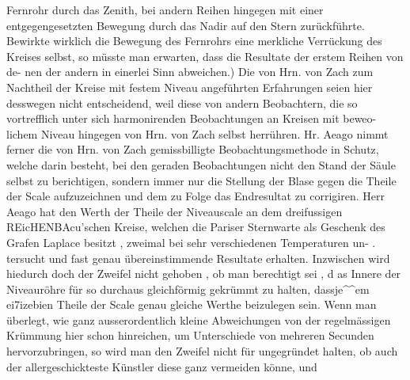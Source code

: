 \documentclass[12pt,a4paper]{article}
\begin{document}
Fernrohr durch das Zenith, bei andern Reihen hingegen mit einer entgegengesetzten Bewegung durch\newline
das Nadir auf den Stern zurückführte. Bewirkte wirklich die Bewegung des Fernrohrs eine merkliche\newline
Verrückung des Kreises selbst, so müsste man erwarten, dass die Resultate der erstem Reihen von de-\newline
nen der andern in einerlei Sinn abweichen.) Die von Hrn. von Zach zum Nachtheil der Kreise mit\newline
festem Niveau angeführten Erfahrungen seien hier desswegen nicht entscheidend, weil diese von andern\newline
Beobachtern, die so vortrefflich unter sich harmonirenden Beobachtungen an Kreisen mit beweo-lichem\newline
Niveau hingegen von Hrn. von Zach selbst herrühren. Hr. Aeago nimmt ferner die von Hrn. von Zach\newline
gemissbilligte Beobachtungsmethode in Schutz, welche darin besteht, bei den geraden Beobachtungen\newline
nicht den Stand der Säule selbst zu berichtigen, sondern immer nur die Stellung der Blase gegen die\newline
Theile der Scale aufzuzeichnen und dem zu Folge das Endresultat zu corrigiren. Herr Aeago hat den\newline
Werth der Theile der Niveauscale an dem dreifussigen REicHENBAcu'schen Kreise, welchen die Pariser\newline
Sternwarte als Geschenk des Grafen Laplace besitzt , zweimal bei sehr verschiedenen Temperaturen un- .\newline
tersucht und fast genau übereinstimmende Resultate erhalten. Inzwischen wird hiedurch doch der\newline
Zweifel nicht gehoben , ob man berechtigt sei , d as Innere der Niveauröhre für so durchaus gleichförmig\newline
gekrümmt zu halten, dassje\^{}\^{}em ei7izebien Theile der Scale genau gleiche Werthe beizulegen sein. Wenn\newline
man überlegt, wie ganz ausserordentlich kleine Abweichungen von der regelmässigen Krümmung hier\newline
schon hinreichen, um Unterschiede von mehreren Secunden hervorzubringen, so wird man den Zweifel\newline
nicht für ungegründet halten, ob auch der allergeschickteste Künstler diese ganz vermeiden könne, und\newline
\end{document}
